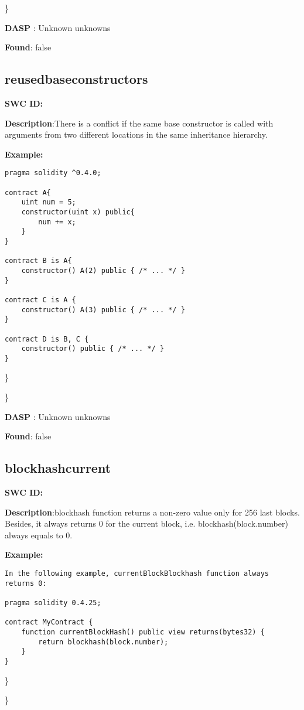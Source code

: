 \documentclass{article}
\begin{document}
\} 

\textbf{DASP} : Unknown unknowns

\textbf{Found}: false

\subsection{reused\textunderscore base\textunderscore constructors} 
\textbf{SWC \textunderscore ID:} 

\textbf{Description}:There is a conflict if the same base constructor is called with arguments from two different locations in the same inheritance hierarchy.


\textbf{Example:} 
\begin{verbatim}
pragma solidity ^0.4.0;

contract A{
    uint num = 5;
    constructor(uint x) public{
        num += x;
    }
}

contract B is A{
    constructor() A(2) public { /* ... */ }
}

contract C is A {
    constructor() A(3) public { /* ... */ }
}

contract D is B, C {
    constructor() public { /* ... */ }
}

\end{verbatim}\} 

\} 

\textbf{DASP} : Unknown unknowns

\textbf{Found}: false

\subsection{blockhash\textunderscore current} 
\textbf{SWC \textunderscore ID:} 

\textbf{Description}:blockhash function returns a non-zero value only for 256 last blocks. Besides, it always returns 0 for the current block, i.e. blockhash(block.number) always equals to 0.


\textbf{Example:} 
\begin{verbatim}
In the following example, currentBlockBlockhash function always returns 0:

pragma solidity 0.4.25;

contract MyContract {
    function currentBlockHash() public view returns(bytes32) {
        return blockhash(block.number);
    }
}

\end{verbatim}\} 

\} 
\end{document}
